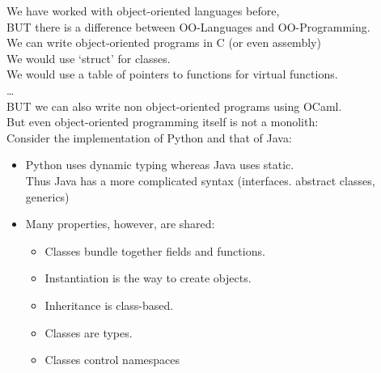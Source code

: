 \documentclass[../../lecture_notes.tex]{subfiles}
\begin{document}
\noindent We have worked with object-oriented languages before, \\
\indent BUT there is a difference between OO-Languages and OO-Programming.\\
We can write object-oriented programs in C (or even assembly)\\
	\indent We would use ‘struct’ for classes.\\
	\indent We would use a table of pointers to functions for virtual functions.\\
	\indent …\\
BUT we can also write non object-oriented programs using OCaml.\\

But even object-oriented programming itself is not a monolith:\\
Consider the implementation of Python and that of Java:
	\begin{itemize} [itemsep=0mm]
		\item Python uses dynamic typing whereas Java uses static.\\
			Thus Java has a more complicated syntax (interfaces. abstract classes, generics)
		\item Many properties, however, are shared:
			\begin{itemize} [itemsep=0mm]
				\item Classes bundle together fields and functions.
				\item Instantiation is the way to create objects.
				\item Inheritance is class-based.
				\item Classes are types.
				\item Classes control namespaces
			\end{itemize}
	\end{itemize}
\end{document}
